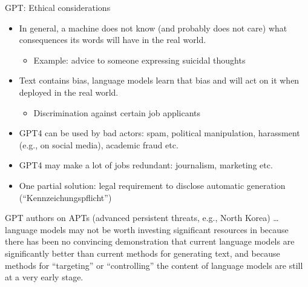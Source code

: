 \begin{frame}{GPT: Ethical considerations}

\vfill

  \begin{itemize}
\item In general, a machine does not know (and
probably does not care) what consequences its words will have
in the real world.
  \begin{itemize}
\item Example: advice to someone expressing suicidal thoughts
    \end{itemize}
\item Text contains bias, language models learn that
bias and will act on it when deployed in the real world.
  \begin{itemize}
\item Discrimination against certain job applicants
    \end{itemize}
\item GPT4 can be
used by bad actors: spam, political manipulation, harassment
(e.g., on social media), academic fraud etc.
\item GPT4 may make a
lot of jobs redundant: journalism, marketing etc.
\item One partial solution: legal requirement to
disclose automatic generation (``Kennzeichungspflicht'')
    \end{itemize}

\vfill

\end{frame}


\begin{frame}{}

\vfill

  \begin{block}{GPT authors on APTs (advanced persistent
      threats, e.g., North Korea)}
\ldots language models may not be worth investing significant
resources in because there has been no convincing
demonstration that current language models are significantly
better than current methods for generating text, and because
methods for
``targeting'' or ``controlling'' the content of language models
are still at a very early stage.
    \end{block}

\vfill

\end{frame}

